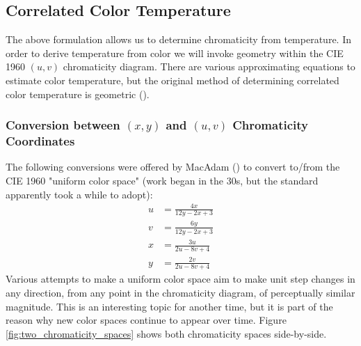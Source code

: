 \documentclass[twocolumn]{article}
\newif\ifinvert
\begin{document}
\begin{figure*}[h]
    \ifinvert
        
    \else
        
    \fi
    \caption{Blackbody spectra for selected temperatures and their chromaticities plotted along the Planckian locus in CIE 1931 2$^\circ$ $(x,y)$ chromaticity space.  Note that the Planckian locus is not actually drawn out to infinity - it ends at $10^{10}K$ here - but chromaticity changes become infinitesimal as temperatures become infinite.  IMAGE LINK, CODE LINK}\label{fig:blackbody_spectra}
\end{figure*}
\subsection{Correlated Color Temperature}
The above formulation allows us to determine chromaticity from temperature.  In order to derive temperature from color we will invoke geometry within the CIE 1960 $(u,v)$ chromaticity diagram.  There are various approximating equations to estimate color temperature, but the original method of determining correlated color temperature is geometric (\cite{kelly1963lines}).
\subsubsection{Conversion between $(x,y)$ and $(u,v)$ Chromaticity Coordinates}
The following conversions were offered by MacAdam (\cite{macadam1937projective}) to convert to/from the CIE 1960 "uniform color space" (work began in the 30s, but the standard apparently took a while to adopt):
\begin{equation}
    \begin{aligned}
        u&=\frac{4x}{12y-2x+3}\\
        v&=\frac{6y}{12y-2x+3}\\
        x&=\frac{3u}{2u-8v+4}\\
        y&=\frac{2v}{2u-8v+4}
    \end{aligned}
\end{equation}
Various attempts to make a uniform color space aim to make unit step changes in any direction, from any point in the chromaticity diagram, of perceptually similar magnitude.  This is an interesting topic for another time, but it is part of the reason why new color spaces continue to appear over time.  Figure \ref{fig:two_chromaticity_spaces} shows both chromaticity spaces side-by-side.
\begin{figure*}[h]
    \ifinvert
        
    \else
        
    \fi
    \caption{CIE 1931 $(x,y)$ (left) and CIE 1960 $(u,v)$ (right) chromaticity diagrams.  The sRGB color gamut triangle is present in both diagrams along with the Planckian locus.  IMAGE LINK, CODE LINK}\label{fig:two_chromaticity_spaces}
\end{figure*}
\end{document}
